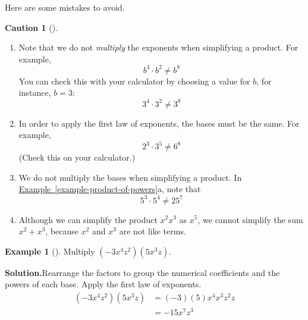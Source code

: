 \documentclass[10pt,]{book}
\theoremstyle{plain}
\theoremstyle{definition}
\newtheorem{warning}[theorem]{Caution}
\theoremstyle{definition}
\newtheorem{example}[theorem]{Example}
\theoremstyle{definition}
\numberwithin{equation}{part}
\newcommand{\amp}{&}
\begin{document}
\par
Here are some mistakes to avoid.%
\begin{warning}[]\label{warning-5}
\leavevmode%
\begin{enumerate}[label=*\arabic**]
\item\hypertarget{li-187}{}Note that we do not \emph{multiply} the exponents when simplifying a product. For example,%
\begin{equation*}
b^4 \cdot b^2 \ne b^8
\end{equation*}
You can check this with your calculator by choosing a value for \(b\), for instance, \(b = 3\):%
\begin{equation*}
3^4 \cdot 3^2\ne 3^8
\end{equation*}
%
\item\hypertarget{li-188}{}In order to apply the first law of exponents, the bases must be the same. For example,%
\begin{equation*}
2^3 \cdot 3^5 \ne 6^8
\end{equation*}
(Check this on your calculator.)%
\item\hypertarget{li-189}{}We do not multiply the bases when simplifying a product. In \hyperref[example-product-of-powers]{Example~\ref{example-product-of-powers}}a, note that%
\begin{equation*}
5^3 \cdot 5^4\ne 25^7
\end{equation*}
%
\item\hypertarget{li-190}{}Although we can simplify the product \(x^2x^3\) as \(x^5\), we cannot simplify the sum \(x^2 + x^3\), because \(x^2\) and \(x^3\) are not like terms.%
\end{enumerate}
%
\end{warning}
\begin{example}[]\label{example-34}
Multiply \((−3x^4z^2) (5x^3 z)\).%
\par\medskip\noindent%
\textbf{Solution.}\quad Rearrange the factors to group the numerical coefficients and the powers of each base. Apply the first law of exponents.%
\begin{align*}
(−3x^4z^2) (5x^3z) \amp = (−3) (5)x^4x^3z^2z\\
\amp = -15x^7z^3
\end{align*}
%
\end{example}
\typeout{************************************************}
\typeout{************************************************}
\end{document}
